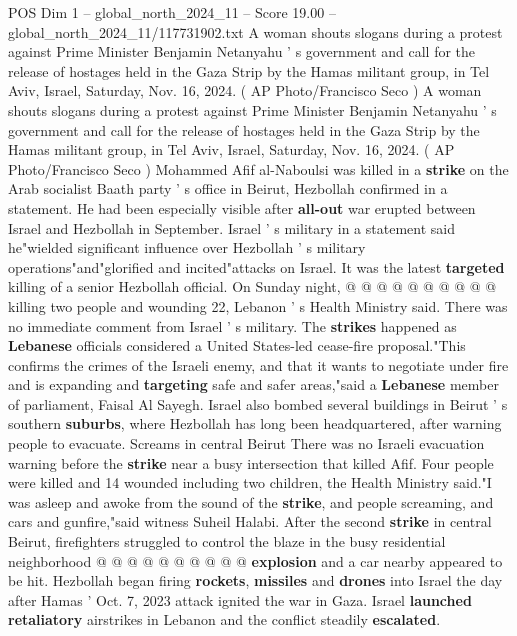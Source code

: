 \begin{textsample}{POS Dim 1 – global\_north\_2024\_11 – Score 19.00 – global\_north\_2024\_11/117731902.txt}  \label{ex:f1_pos_235}
A woman shouts slogans during a protest against Prime Minister Benjamin Netanyahu ' s government and call for the release of hostages held in the Gaza Strip by the Hamas militant group, in Tel Aviv, Israel, Saturday, Nov. 16, 2024. ( AP Photo/Francisco Seco ) A woman shouts slogans during a protest against Prime Minister Benjamin Netanyahu ' s government and call for the release of hostages held in the Gaza Strip by the Hamas militant group, in Tel Aviv, Israel, Saturday, Nov. 16, 2024. ( AP Photo/Francisco Seco ) Mohammed Afif al-Naboulsi was killed in a \textbf{strike} on the Arab socialist Baath party ' s office in Beirut, Hezbollah confirmed in a statement.
He had been especially visible after \textbf{all-out} war erupted between Israel and Hezbollah in September.
Israel ' s military in a statement said he"wielded significant influence over Hezbollah ' s military operations"and"glorified and incited"attacks on Israel.
It was the latest \textbf{targeted} killing of a senior Hezbollah official.
On Sunday night, @ @ @ @ @ @ @ @ @ @ killing two people and wounding 22, Lebanon ' s Health Ministry said.
There was no immediate comment from Israel ' s military.
The \textbf{strikes} happened as \textbf{Lebanese} officials considered a United States-led cease-fire proposal."This confirms the crimes of the Israeli enemy, and that it wants to negotiate under fire and is expanding and \textbf{targeting} safe and safer areas,"said a \textbf{Lebanese} member of parliament, Faisal Al Sayegh.
Israel also bombed several buildings in Beirut ' s southern \textbf{suburbs}, where Hezbollah has long been headquartered, after warning people to evacuate.
Screams in central Beirut There was no Israeli evacuation warning before the \textbf{strike} near a busy intersection that killed Afif.
Four people were killed and 14 wounded including two children, the Health Ministry said."I was asleep and awoke from the sound of the \textbf{strike}, and people screaming, and cars and gunfire,"said witness Suheil Halabi.
After the second \textbf{strike} in central Beirut, firefighters struggled to control the blaze in the busy residential neighborhood @ @ @ @ @ @ @ @ @ @ \textbf{explosion} and a car nearby appeared to be hit.
Hezbollah began firing \textbf{rockets}, \textbf{missiles} and \textbf{drones} into Israel the day after Hamas ' Oct. 7, 2023 attack ignited the war in Gaza.
Israel \textbf{launched} \textbf{retaliatory} airstrikes in Lebanon and the conflict steadily \textbf{escalated}.

\end{textsample}
